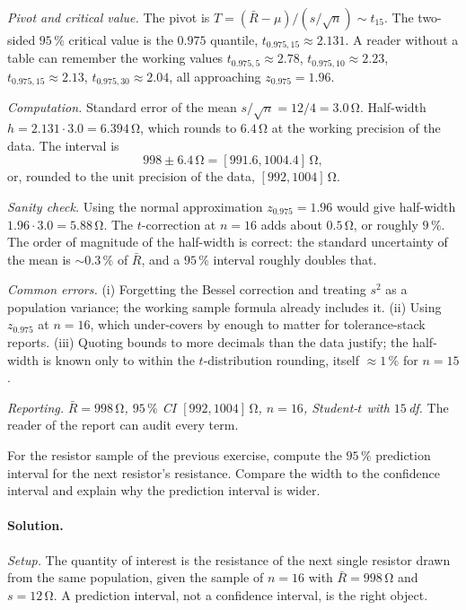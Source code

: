 \textit{Pivot and critical value.} The pivot is
$T = (\bar{R} - \mu)/(s/\sqrt{n}) \sim t_{15}$. The two-sided
$95 \,\%$ critical value is the $0.975$ quantile,
$t_{0.975, 15} \approx 2.131$. A reader without a table can
remember the working values $t_{0.975, 5} \approx 2.78$,
$t_{0.975, 10} \approx 2.23$, $t_{0.975, 15} \approx 2.13$,
$t_{0.975, 30} \approx 2.04$, all approaching $z_{0.975} = 1.96$.

\textit{Computation.} Standard error of the mean
$s/\sqrt{n} = 12/4 = 3.0 \,\si{\ohm}$. Half-width
$h = 2.131 \cdot 3.0 = 6.394 \,\si{\ohm}$, which rounds to
$6.4 \,\si{\ohm}$ at the working precision of the data. The
interval is
\[
998 \pm 6.4 \,\si{\ohm} = [991.6, 1004.4] \,\si{\ohm},
\]
or, rounded to the unit precision of the data,
$[992, 1004] \,\si{\ohm}$.

\textit{Sanity check.} Using the normal approximation
$z_{0.975} = 1.96$ would give half-width
$1.96 \cdot 3.0 = 5.88 \,\si{\ohm}$. The $t$-correction at $n = 16$
adds about $0.5 \,\si{\ohm}$, or roughly $9 \,\%$. The order of
magnitude of the half-width is correct: the standard uncertainty of
the mean is $\sim 0.3 \,\%$ of $\bar{R}$, and a $95 \,\%$ interval
roughly doubles that.

\textit{Common errors.} (i) Forgetting the Bessel correction and
treating $s^{2}$ as a population variance; the working sample
formula already includes it. (ii) Using $z_{0.975}$ at $n = 16$,
which under-covers by enough to matter for tolerance-stack reports.
(iii) Quoting bounds to more decimals than the data justify; the
half-width is known only to within the $t$-distribution rounding,
itself $\approx 1 \,\%$ for $n = 15$.

\textit{Reporting.} \emph{$\bar{R} = 998 \,\si{\ohm}$, $95 \,\%$ CI
$[992, 1004] \,\si{\ohm}$, $n = 16$, Student-$t$ with $15 \,$df.}
The reader of the report can audit every term.

\begin{exercise}
For the resistor sample of the previous exercise, compute the
$95 \,\%$ prediction interval for the next resistor's resistance.
Compare the width to the confidence interval and explain why the
prediction interval is wider.
\end{exercise}

\paragraph{Solution.}
\textit{Setup.} The quantity of interest is the resistance of the
next single resistor drawn from the same population, given the
sample of $n = 16$ with $\bar{R} = 998 \,\si{\ohm}$ and
$s = 12 \,\si{\ohm}$. A prediction interval, not a confidence
interval, is the right object.

